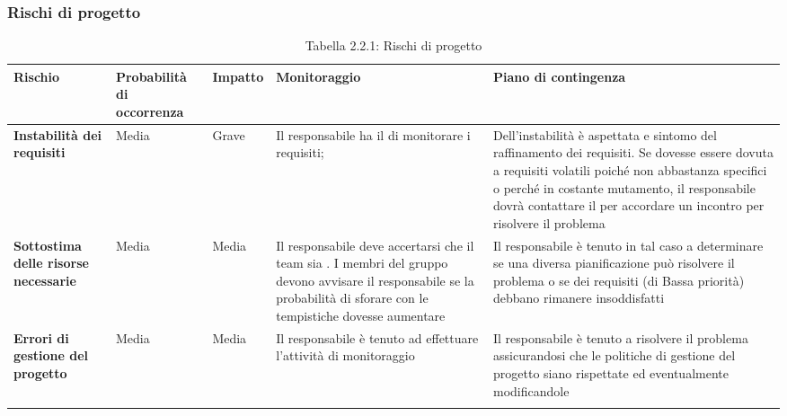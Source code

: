 	\subsubsection{Rischi di progetto}
\renewcommand{\arraystretch}{1.5}
\begin{longtable}{| m{8em} | m{6em} | m{4em} | m{9em} | m{9em} |}
\hline 
\rowcolor{title_row}
\textbf{\color{title_text}Rischio} & \textbf{\color{title_text}Probabilità di occorrenza} & \textbf{\color{title_text}Impatto} & \textbf{\color{title_text}Monitoraggio} & \textbf{\color{title_text}Piano di contingenza} \\
\endhead
\hline \textbf{Instabilità dei requisiti} & Media & Grave &
	Il responsabile ha il \gl{compito} di monitorare i requisiti; &
	Dell'instabilità è aspettata e sintomo del raffinamento dei requisiti.	Se dovesse essere dovuta a requisiti volatili poiché non abbastanza specifici o perché in costante mutamento, il responsabile dovrà contattare il \gl{Proponente} per accordare un incontro per risolvere il problema \\
\hline \textbf{Sottostima delle risorse necessarie} & Media & Media &
	Il responsabile deve accertarsi che il team sia \gl{in-schedule}. I membri del gruppo devono avvisare il responsabile se la probabilità di sforare con le tempistiche dovesse aumentare &
	Il responsabile è tenuto in tal caso a determinare se una diversa pianificazione può risolvere il problema o se dei requisiti (di Bassa priorità) debbano rimanere insoddisfatti\\
\hline \textbf{Errori di gestione del progetto} & Media & Media &
	Il responsabile è tenuto ad effettuare l'attività di monitoraggio &
	Il responsabile è tenuto a risolvere il problema assicurandosi che le politiche di gestione del progetto siano rispettate ed eventualmente modificandole\\
\hline
\caption{Tabella 2.2.1: Rischi di progetto\label{}}
\end{longtable}
\pagebreak
\renewcommand{\arraystretch}{1}		
